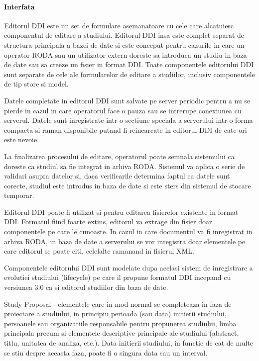 \paragraph{Interfata}

Editorul DDI este un set de formulare asemanatoare cu cele care alcatuiesc componentul de editare a studiului. Editorul DDI insa este complet separat de structura principala a bazei de date si este conceput pentru cazurile in care un operator RODA sau un utilizator extern doreste sa introduca un studiu in baza de date sau sa creeze un fisier in format DDI. Toate componentele editorului DDI sunt separate de cele ale formularelor de editare a studiilor, inclusiv componentele de tip store si model. 

Datele completate in editorul DDI sunt salvate pe server periodic pentru a nu se pierde in cazul in care operatorul face o pauza sau se intrerupe conexiunea cu serverul. Datele sunt inregistrate intr-o sectiune speciala a serverului intr-o forma compacta si raman disponibile putand fi reincarcate in editorul DDI de cate ori este nevoie. 

La finalizarea procesului de editare, operatorul poate semnala sistemului ca doreste ca studiul sa fie integrat in arhiva RODA. Sistemul va aplica o serie de validari asupra datelor si, daca verificarile determina faptul ca datele sunt corecte, studiul este introdus in baza de date si este sters din sistemul de stocare temporar. 

Editorul DDI poate fi utilizat si pentru editarea fisierelor existente in format DDI. Formatul fiind foarte extins, editorul va extrage din fisier doar componentele pe care le cunoaste. In cazul in care documentul va fi inregistrat in arhiva RODA, in baza de date a serverului se vor inregistra doar elementele pe care editorul se poate citi, celelalte ramanand in fisierul XML. 

Componentele editorului DDI sunt modelate dupa acelasi sistem de inregistrare a evolutiei studiului (lifecycle) pe care il propune formatul DDI incepand cu versiunea 3.0 ca si editorul studiilor din baza de date. 

Study Proposal - elementele care in mod normal se completeaza in faza de proiectare a studiului, in principiu perioada (sau data) initierii studiului, persoanele sau organizatiile responsabile pentru propunerea studiului, limba principala precum si elementele descriptive principale ale studiului (abstract, titlu, unitatea de analiza, etc.). Data initierii studiului, in functie de cat de multe se stiu despre aceasta faza, poate fi o singura data sau un interval.


